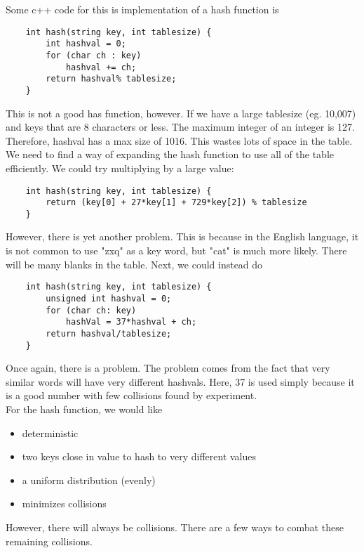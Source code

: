 \documentclass[]{article}
\begin{document}
Some c++ code for this is implementation of a hash function is

\begin{lstlisting}
	int hash(string key, int tablesize) {
		int hashval = 0;
		for (char ch : key)
			hashval += ch;
		return hashval% tablesize;
	}
\end{lstlisting}\bigbreak

This is not a good has function, however. If we have a large tablesize (eg. 10,007) and keys that are 8 characters or less. The maximum integer of an integer is 127. Therefore, hashval has a max size of 1016. This wastes lots of space in the table. We need to find a way of expanding the hash function to use all of the table efficiently. We could try multiplying by a large value:

\begin{lstlisting}
	int hash(string key, int tablesize) {
		return (key[0] + 27*key[1] + 729*key[2]) % tablesize
	}
\end{lstlisting}\bigbreak

However, there is yet another problem. This is because in the English language, it is not common to use "zxq" as a key word, but "cat" is much more likely. There will be many blanks in the table. Next, we could instead do

\begin{lstlisting}
	int hash(string key, int tablesize) {
		unsigned int hashval = 0;
		for (char ch: key) 
			hashVal = 37*hashval + ch;
		return hashval/tablesize;
	}
\end{lstlisting}\bigbreak

Once again, there is a problem. The problem comes from the fact that very similar words will have very different hashvals. Here, 37 is used simply because it is a good number with few collisions found by experiment.\\

For the hash function, we would like 

\begin{itemize}
	\item deterministic
	\item two keys close in value to hash to very different values
	\item a uniform distribution (evenly)
	\item minimizes collisions
\end{itemize}

However, there will always be collisions. There are a few ways to combat these remaining collisions.\\
\end{document}
